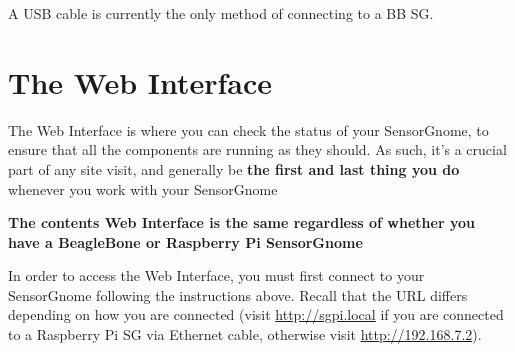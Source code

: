 \documentclass[
]{book}
\begin{document}
A USB cable is currently the only method of connecting to a BB SG.

\hypertarget{the-web-interface}{%
\chapter{The Web Interface}\label{the-web-interface}}

The Web Interface is where you can check the status of your SensorGnome, to ensure that all the components are running as they should. As such, it's a crucial part of any site visit, and generally be \textbf{the first and last thing you do} whenever you work with your SensorGnome

\textbf{The contents Web Interface is the same regardless of whether you have a BeagleBone or Raspberry Pi SensorGnome}

In order to access the Web Interface, you must first connect to your SensorGnome following the instructions above. Recall that the URL differs depending on how you are connected (visit \url{http://sgpi.local} if you are connected to a Raspberry Pi SG via Ethernet cable, otherwise visit \url{http://192.168.7.2}).
\end{document}
